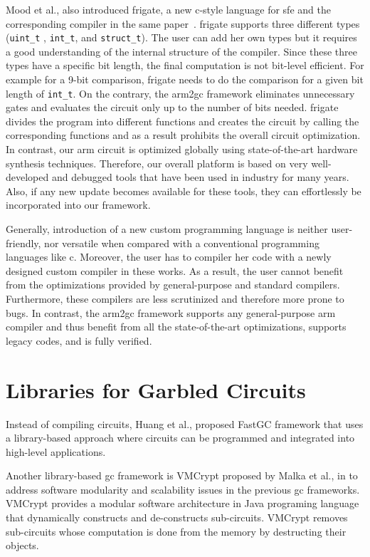 Mood et al., also introduced \gls{frigate}, a new \gls{c}-style language for \acrshort{sfe} and the corresponding compiler in the same paper~\cite{mood2016frigate}.
\gls{frigate} supports three different types (\texttt{uint\_t} , \texttt{int\_t}, and \texttt{struct\_t}).
The user can add her own types but it requires a good understanding of the internal structure of the compiler.
Since these three types have a specific bit length, the final computation is not bit-level efficient.
For example for a 9-bit comparison, \gls{frigate} needs to do the comparison for a given bit length of \texttt{int\_t}.
On the contrary, the \gls{arm2gc} framework eliminates unnecessary gates and evaluates the circuit only up to the number of bits needed.
\gls{frigate} divides the program into different functions and creates the circuit by calling the corresponding functions and as a result prohibits the overall circuit optimization.
In contrast, our \gls{arm} circuit is optimized globally using state-of-the-art hardware synthesis techniques.
Therefore, our overall platform is based on very well-developed and debugged tools that have been used in industry for many years.
Also, if any new update becomes available for these tools, they can effortlessly be incorporated into our framework.

Generally, introduction of a new custom programming language is neither user-friendly, nor versatile when compared with a conventional programming languages like \gls{c}.
Moreover, the user has to compiler her code with a newly designed custom compiler in these works.
As a result, the user cannot benefit from the optimizations provided by general-purpose and standard compilers.
Furthermore, these compilers are less scrutinized and therefore more prone to bugs.
In contrast, the \gls{arm2gc} framework supports any general-purpose \gls{arm} compiler and thus benefit from all the state-of-the-art optimizations, supports legacy codes, and is fully verified.

\section{Libraries for Garbled Circuits}\label{sec:related-library}
Instead of compiling circuits, Huang et al., \cite{huang2011faster} proposed  FastGC framework that uses a library-based approach where circuits can be programmed and integrated into high-level applications.

Another library-based \acrshort{gc} framework is VMCrypt proposed by Malka et al., in \cite{malka2011vmcrypt} to address software modularity and scalability issues in the previous \acrshort{gc} frameworks.
VMCrypt provides a modular software architecture in Java programing language that dynamically constructs and de-constructs sub-circuits.
VMCrypt removes sub-circuits whose computation is done from the memory by destructing their objects.

